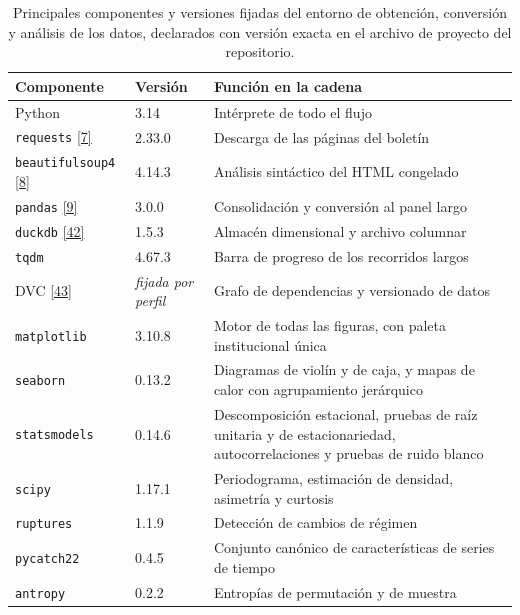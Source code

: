 \documentclass[12pt,letterpaper]{report}
\newcommand{\cita}[1]{\hyperref[bib:#1]{[#1]}}
\begin{document}
\begin{table}[htbp]
\centering
\footnotesize
\caption[Entorno de ejecución]{Principales componentes y versiones fijadas del entorno de
obtención, conversión y análisis de los datos, declarados con versión exacta en el archivo de
proyecto del repositorio.}
\label{tab:entorno}
\begin{tabular}{p{4.0cm}p{2.6cm}p{7.0cm}}
\toprule
\rowcolor{uacjblue!15}
\textbf{Componente} & \textbf{Versión} & \textbf{Función en la cadena} \\ \midrule
Python                            & 3.14     & Intérprete de todo el flujo \\
\texttt{requests} \cita{7}     & 2.33.0   & Descarga de las páginas del boletín \\
\texttt{beautifulsoup4} \cita{8} & 4.14.3 & Análisis sintáctico del HTML congelado \\
\texttt{pandas} \cita{9}    & 3.0.0    & Consolidación y conversión al panel largo \\
\texttt{duckdb} \cita{42}      & 1.5.3    & Almacén dimensional y archivo columnar \\
\texttt{tqdm}                     & 4.67.3   & Barra de progreso de los recorridos largos \\
DVC \cita{43}                  & \textit{fijada por perfil} & Grafo de dependencias y versionado de datos \\
\texttt{matplotlib}               & 3.10.8   & Motor de todas las figuras, con paleta institucional única \\
\texttt{seaborn}                  & 0.13.2   & Diagramas de violín y de caja, y mapas de calor con agrupamiento jerárquico \\
\texttt{statsmodels}              & 0.14.6   & Descomposición estacional, pruebas de raíz unitaria y de estacionariedad, autocorrelaciones y pruebas de ruido blanco \\
\texttt{scipy}                    & 1.17.1   & Periodograma, estimación de densidad, asimetría y curtosis \\
\texttt{ruptures}                 & 1.1.9    & Detección de cambios de régimen \\
\texttt{pycatch22}                & 0.4.5    & Conjunto canónico de características de series de tiempo \\
\texttt{antropy}                  & 0.2.2    & Entropías de permutación y de muestra \\
\bottomrule
\end{tabular}
\end{table}
\end{document}
